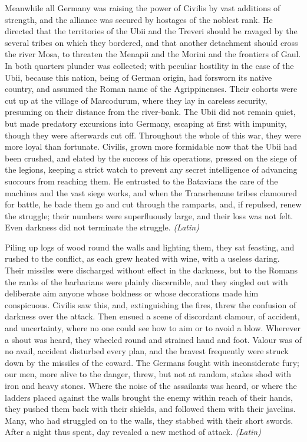
Meanwhile all Germany was raising the power of Civilis by vast additions of strength, and the alliance was secured by hostages of the noblest rank. He directed that the territories of the Ubii and the Treveri should be ravaged by the several tribes on which they bordered, and that another detachment should cross the river Mosa, to threaten the Menapii and the Morini and the frontiers of Gaul. In both quarters plunder was collected; with peculiar hostility in the case of the Ubii, because this nation, being of German origin, had forsworn its native country, and assumed the Roman name of the Agrippinenses. Their cohorts were cut up at the village of Marcodurum, where they lay in careless security, presuming on their distance from the river-bank. The Ubii did not remain quiet, but made predatory excursions into Germany, escaping at first with impunity, though they were afterwards cut off. Throughout the whole of this war, they were more loyal than fortunate. Civilis, grown more formidable now that the Ubii had been crushed, and elated by the success of his operations, pressed on the siege of the legions, keeping a strict watch to prevent any secret intelligence of advancing succours from reaching them. He entrusted to the Batavians the care of the machines and the vast siege works, and when the Transrhenane tribes clamoured for battle, he bade them go and cut through the ramparts, and, if repulsed, renew the struggle; their numbers were superfluously large, and their loss was not felt. Even darkness did not terminate the struggle. \emph{(Latin)}


Piling up logs of wood round the walls and lighting them, they sat feasting, and rushed to the conflict, as each grew heated with wine, with a useless daring. Their missiles were discharged without effect in the darkness, but to the Romans the ranks of the barbarians were plainly discernible, and they singled out with deliberate aim anyone whose boldness or whose decorations made him conspicuous. Civilis saw this, and, extinguishing the fires, threw the confusion of darkness over the attack. Then ensued a scene of discordant clamour, of accident, and uncertainty, where no one could see how to aim or to avoid a blow. Wherever a shout was heard, they wheeled round and strained hand and foot. Valour was of no avail, accident disturbed every plan, and the bravest frequently were struck down by the missiles of the coward. The Germans fought with inconsiderate fury; our men, more alive to the danger, threw, but not at random, stakes shod with iron and heavy stones. Where the noise of the assailants was heard, or where the ladders placed against the walls brought the enemy within reach of their hands, they pushed them back with their shields, and followed them with their javelins. Many, who had struggled on to the walls, they stabbed with their short swords. After a night thus spent, day revealed a new method of attack. \emph{(Latin)}

